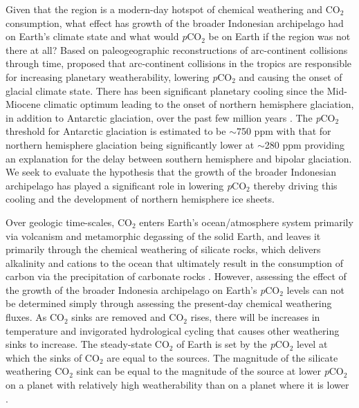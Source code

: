 \documentclass[11pt,letterpaper]{article}
\newcommand{\pCOtwo}{\textit{p}CO$_{2}$\xspace}
\newcommand{\COtwo}{CO$_{2}$\xspace}
\begin{document}
Given that the region is a modern-day hotspot of chemical weathering and \COtwo consumption, what effect has growth of the broader Indonesian archipelago had on Earth's climate state and what would \pCOtwo be on Earth if the region was not there at all? Based on paleogeographic reconstructions of arc-continent collisions through time, \citet{Macdonald2019a} proposed that arc-continent collisions in the tropics are responsible for increasing planetary weatherability, lowering \pCOtwo and causing the onset of glacial climate state. There has been significant planetary cooling since the Mid-Miocene climatic optimum leading to the onset of northern hemisphere glaciation, in addition to Antarctic glaciation, over the past few million years \citep{Shackleton1984a}. The \pCOtwo threshold for Antarctic glaciation is estimated to be $\sim$750 ppm with that for northern hemisphere glaciation being significantly lower at $\sim$280 ppm \citep{DeConto2008a} providing an explanation for the delay between southern hemisphere and bipolar glaciation. We seek to evaluate the hypothesis that the growth of the broader Indonesian archipelago has played a significant role in lowering \pCOtwo thereby driving this cooling and the development of northern hemisphere ice sheets.

Over geologic time-scales, \COtwo enters Earth's ocean/atmosphere system primarily via volcanism and metamorphic degassing of the solid Earth, and leaves it primarily through the chemical weathering of silicate rocks, which delivers alkalinity and cations to the ocean that ultimately result in the consumption of carbon via the precipitation of carbonate rocks \citep{Kump2000a}. However, assessing the effect of the growth of the broader Indonesia archipelago on Earth's \pCOtwo levels can not be determined simply through assessing the present-day chemical weathering fluxes. As \COtwo sinks are removed and \COtwo rises, there will be increases in temperature and invigorated hydrological cycling that causes other weathering sinks to increase. The steady-state \COtwo of Earth is set by the \pCOtwo level at which the sinks of \COtwo are equal to the sources. The magnitude of the silicate weathering \COtwo sink can be equal to the magnitude of the source at lower \pCOtwo on a planet with relatively high weatherability than on a planet where it is lower \citep{Kump1997a}.
\end{document}
